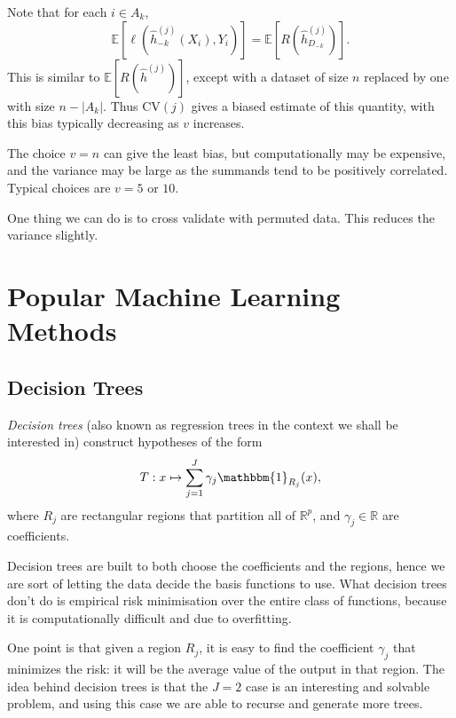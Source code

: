 \documentclass[12pt]{article}
\begin{document}
Note that for each $i \in A_k$,
\[
\mathbb{E}[\ell(\hat h^{(j)}_{-k}(X_i), Y_i)] = \mathbb{E}[R (\hat h^{(j)}_{D_{-k}})].
\]
This is similar to $\mathbb{E}[R(\hat h^{(j)})]$, except with a dataset of size $n$ replaced by one with size $n - |A_k|$. Thus $\mathrm{CV}(j)$ gives a biased estimate of this quantity, with this bias typically decreasing as $v$ increases.

The choice $v = n$ can give the least bias, but computationally may be expensive, and the variance may be large as the summands tend to be positively correlated. Typical choices are $v = 5$ or $10$.

One thing we can do is to cross validate with permuted data. This reduces the variance slightly.

\newpage

\section{Popular Machine Learning Methods}
\label{sec:pop_mac}

\subsection{Decision Trees}
\label{sub:dec_tree}

\emph{Decision trees} (also known as regression trees in the context we shall be interested in) construct hypotheses of the form
\[
T : x \mapsto \sum_{j = 1}^J \gamma_j \mathbbm{1}_{R_j}(x),
\]
where $R_j$ are rectangular regions that partition all of $\mathbb{R}^p$, and $\gamma_j \in \mathbb{R}$ are coefficients.

Decision trees are built to both choose the coefficients and the regions, hence we are sort of letting the data decide the basis functions to use. What decision trees don't do is empirical risk minimisation over the entire class of functions, because it is computationally difficult and due to overfitting.

One point is that given a region $R_j$, it is easy to find the coefficient $\gamma_j$ that minimizes the risk: it will be the average value of the output in that region. The idea behind decision trees is that the $J = 2$ case is an interesting and solvable problem, and using this case we are able to recurse and generate more trees.
\end{document}
